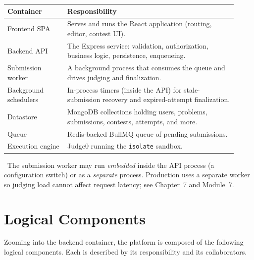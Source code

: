 \documentclass[12pt,a4paper,oneside]{report}
\newcommand{\code}[1]{\texttt{#1}}
\newcommand{\note}[1]{\par\vspace{3pt}\noindent{\color{tcetaccent}\textbf{Note.}}~#1\par\vspace{3pt}}
\begin{document}
\begin{longtable}{@{}p{0.24\linewidth} p{0.68\linewidth}@{}}
\toprule
\textbf{Container} & \textbf{Responsibility}\\
\midrule
\endhead
Frontend SPA & Serves and runs the React application (routing, editor, contest UI).\\
Backend API & The Express service: validation, authorization, business logic, persistence, enqueueing.\\
Submission worker & A background process that consumes the queue and drives judging and finalization.\\
Background schedulers & In-process timers (inside the API) for stale-submission recovery and expired-attempt finalization.\\
Datastore & MongoDB collections holding users, problems, submissions, contests, attempts, and more.\\
Queue & Redis-backed BullMQ queue of pending submissions.\\
Execution engine & Judge0 running the \code{isolate} sandbox.\\
\bottomrule
\end{longtable}

\note{The submission worker may run \emph{embedded} inside the API process (a
configuration switch) or as a \emph{separate} process. Production uses a separate
worker so judging load cannot affect request latency; see Chapter~7 and
Module~7.}

\chapter{Logical Components}
Zooming into the backend container, the platform is composed of the following
logical components. Each is described by its responsibility and its collaborators.
\end{document}
